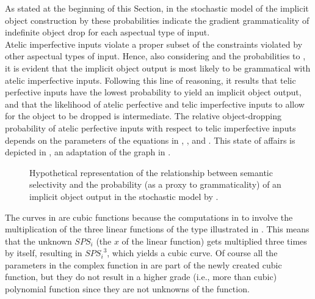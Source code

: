 As stated at the beginning of this Section, in the stochastic model of the implicit object construction by \textcite{Medina2007} these probabilities indicate the gradient grammaticality of indefinite object drop for each aspectual type of input.\\
Atelic imperfective inputs violate a proper subset of the constraints violated by other aspectual types of input. Hence, also considering  and the probabilities  to , it is evident that the implicit object output is most likely to be grammatical with atelic imperfective inputs. Following this line of reasoning, it results that telic perfective inputs have the lowest probability to yield an implicit object output, and that the likelihood of atelic perfective and telic imperfective inputs to allow for the object to be dropped is intermediate. The relative object-dropping probability of atelic perfective inputs with respect to telic imperfective inputs depends on the parameters of the equations in , , and . This state of affairs is depicted in , an adaptation of the graph in \textcite[108]{Medina2007}.

\begin{figure}[htb]
\caption{Hypothetical representation of the relationship between semantic selectivity and the probability (as a proxy to grammaticality) of an implicit object output in the stochastic model by \textcite{Medina2007}. }
\end{figure}

The curves in  are cubic functions because the computations in  to  involve the multiplication of the three linear functions of the type illustrated in . This means that the unknown $SPS_i$ (the $x$ of the linear function) gets multiplied three times by itself, resulting in ${SPS_i}^3$, which yields a cubic curve. Of course all the parameters in the complex function in  are part of the newly created cubic function, but they do not result in a higher grade (i.e., more than cubic) polynomial function since they are not unknowns of the function.

